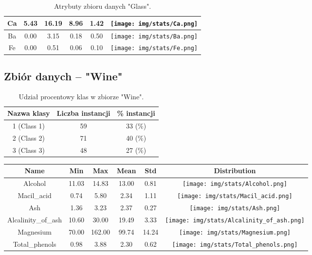\begin{table}[H]
  \center
  \begin{tabular}{|c|c|c|c|c|c|} \hline
  Ca &   5.43 &  16.19 &   8.96 &  1.42 &  \texttt{[image: img/stats/Ca.png]} \\ \hline
  Ba &   0.00 &   3.15 &   0.18 &  0.50 &  \texttt{[image: img/stats/Ba.png]} \\ \hline
  Fe &   0.00 &   0.51 &   0.06 &  0.10 &  \texttt{[image: img/stats/Fe.png]} \\ \hline
\end{tabular}
  \caption{Atrybuty zbioru danych "Glass".}
\end{table}

\pagebreak
\subsection{Zbiór danych -- "Wine"}

\begin{table}[H]
  \center
  \begin{tabular}{|c|c|c|} \hline
    Nazwa klasy & Liczba instancji & \% instancji \\ \hline
    1 (Class 1)  & 59 & 33 (\%)\\ \hline
    2 (Class 2)  & 71 & 40 (\%)\\ \hline
    3 (Class 3)  & 48 & 27 (\%)\\ \hline
  \end{tabular}
  \caption{Udział procentowy klas w zbiorze "Wine".}
\end{table}


\begin{table}[H]
  \center
 \begin{tabular}{|c|c|c|c|c|c|} \hline
                 Name &     Min &      Max &    Mean &     Std &                          Distribution \\ \hline
              Alcohol &   11.03 &    14.83 &   13.00 &    0.81 &               \texttt{[image: img/stats/Alcohol.png]} \\ \hline
           Macil\_acid &    0.74 &     5.80 &    2.34 &    1.11 &            \texttt{[image: img/stats/Macil\_acid.png]} \\ \hline
                  Ash &    1.36 &     3.23 &    2.37 &    0.27 &                   \texttt{[image: img/stats/Ash.png]} \\ \hline
    Alcalinity\_of\_ash &   10.60 &    30.00 &   19.49 &    3.33 &     \texttt{[image: img/stats/Alcalinity\_of\_ash.png]} \\ \hline
            Magnesium &   70.00 &   162.00 &   99.74 &   14.24 &             \texttt{[image: img/stats/Magnesium.png]} \\ \hline
        Total\_phenols &    0.98 &     3.88 &    2.30 &    0.62 &         \texttt{[image: img/stats/Total\_phenols.png]} \\ \hline
\end{tabular}
\end{table}

